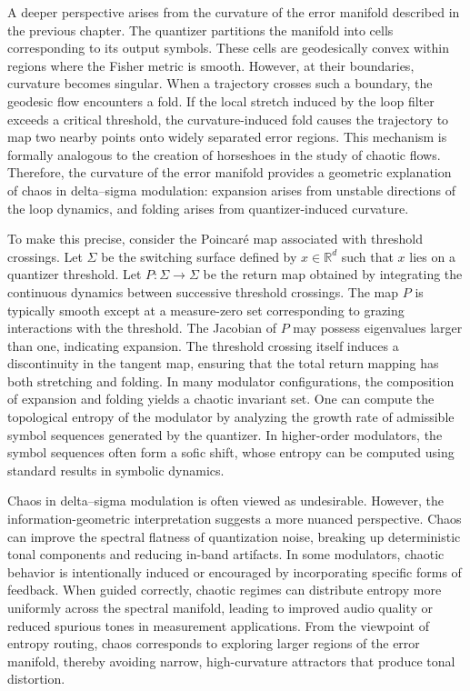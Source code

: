 A deeper perspective arises from the curvature of the error manifold described in the previous chapter. The quantizer partitions the manifold into cells corresponding to its output symbols. These cells are geodesically convex within regions where the Fisher metric is smooth. However, at their boundaries, curvature becomes singular. When a trajectory crosses such a boundary, the geodesic flow encounters a fold. If the local stretch induced by the loop filter exceeds a critical threshold, the curvature-induced fold causes the trajectory to map two nearby points onto widely separated error regions. This mechanism is formally analogous to the creation of horseshoes in the study of chaotic flows. Therefore, the curvature of the error manifold provides a geometric explanation of chaos in delta–sigma modulation: expansion arises from unstable directions of the loop dynamics, and folding arises from quantizer-induced curvature.

To make this precise, consider the Poincaré map associated with threshold crossings. Let \( \Sigma \) be the switching surface defined by \( x \in \mathbb{R}^{d} \) such that \( x \) lies on a quantizer threshold. Let \(P: \Sigma \to \Sigma\) be the return map obtained by integrating the continuous dynamics between successive threshold crossings. The map \(P\) is typically smooth except at a measure-zero set corresponding to grazing interactions with the threshold. The Jacobian of \(P\) may possess eigenvalues larger than one, indicating expansion. The threshold crossing itself induces a discontinuity in the tangent map, ensuring that the total return mapping has both stretching and folding. In many modulator configurations, the composition of expansion and folding yields a chaotic invariant set. One can compute the topological entropy of the modulator by analyzing the growth rate of admissible symbol sequences generated by the quantizer. In higher-order modulators, the symbol sequences often form a sofic shift, whose entropy can be computed using standard results in symbolic dynamics.

Chaos in delta–sigma modulation is often viewed as undesirable. However, the information-geometric interpretation suggests a more nuanced perspective. Chaos can improve the spectral flatness of quantization noise, breaking up deterministic tonal components and reducing in-band artifacts. In some modulators, chaotic behavior is intentionally induced or encouraged by incorporating specific forms of feedback. When guided correctly, chaotic regimes can distribute entropy more uniformly across the spectral manifold, leading to improved audio quality or reduced spurious tones in measurement applications. From the viewpoint of entropy routing, chaos corresponds to exploring larger regions of the error manifold, thereby avoiding narrow, high-curvature attractors that produce tonal distortion.

